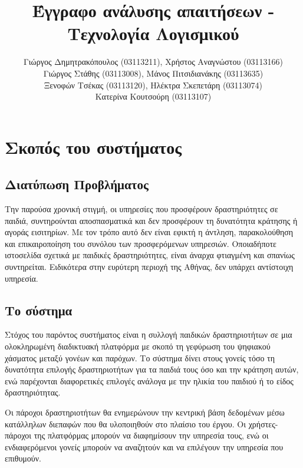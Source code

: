 \documentclass[letterpaper,6pt]{article}
\begin{document}
\title{Έγγραφο ανάλυσης απαιτήσεων - Τεχνολογία Λογισμικού}
\author{
  Γιώργος Δημητρακόπουλος (03113211), Χρήστος Αναγνώστου (03113166) \\
  Γιώργος Στάθης (03113008), Μάνος Πιτσιδιανάκης (03113635) \\ Ξενοφών Τσέκας (03113120), Ηλέκτρα Σκεπετάρη (03113074) \\
Κατερίνα Κουτσούρη (03113107)
}
\maketitle
\tableofcontents{}
\section{Σκοπός του συστήματος}

\subsection{Διατύπωση Προβλήματος}

Την παρούσα χρονική στιγμή, οι υπηρεσίες που προσφέρουν δραστηριότητες σε παιδιά, συντηρούνται αποσπασματικά και δεν προσφέρουν τη δυνατότητα κράτησης ή αγοράς εισιτηρίων. Με τον τρόπο αυτό δεν είναι εφικτή η άντληση, παρακολούθηση και επικαιροποίηση του συνόλου των προσφερόμενων υπηρεσιών. Οποιαδήποτε ιστοσελίδα σχετικά με παιδικές δραστηριότητες, είναι άναρχα φτιαγμένη και σπανίως συντηρείται. Ειδικότερα στην ευρύτερη περιοχή της Αθήνας, δεν υπάρχει αντίστοιχη υπηρεσία.

\subsection{Το σύστημα}

Στόχος του παρόντος συστήματος είναι η συλλογή παιδικών δραστηριοτήτων σε μια ολοκληρωμένη διαδικτυακή πλατφόρμα με σκοπό τη γεφύρωση του ψηφιακού χάσματος μεταξύ γονέων και παρόχων. Το σύστημα δίνει στους γονείς τόσο τη δυνατότητα επιλογής δραστηριοτήτων για τα παιδιά τους όσο και την κράτηση αυτών, ενώ παρέχονται διαφορετικές επιλογές ανάλογα με την ηλικία του παιδιού ή το είδος δραστηριότητας.

Οι πάροχοι δραστηριοτήτων θα ενημερώνουν την κεντρική βάση δεδομένων μέσω κατάλληλων διεπαφών που θα υλοποιηθούν στο πλαίσιο του έργου. Οι χρήστες-πάροχοι της πλατφόρμας μπορούν να διαφημίσουν την υπηρεσία τους, ενώ οι ενδιαφερόμενοι γονείς μπορούν να αναζητούν και να επιλέγουν την υπηρεσία που επιθυμούν.
\end{document}

